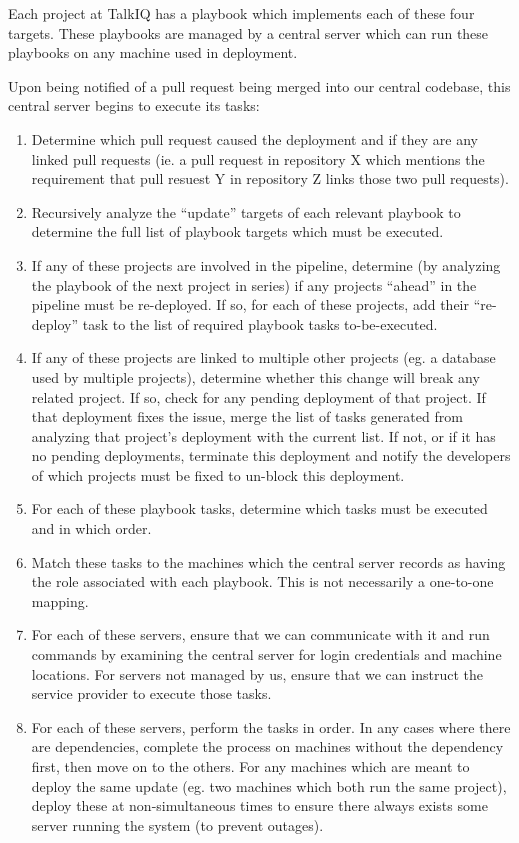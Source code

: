 \documentclass[12pt]{article}
\begin{document}
Each project at TalkIQ has a playbook which implements each of these four targets. These playbooks are managed by a central server which can run these playbooks on any machine used in deployment.

Upon being notified of a pull request being merged into our central codebase, this central server begins to execute its tasks:
\begin{enumerate}
\item Determine which pull request caused the deployment and if they are any linked pull requests (ie. a pull request in repository X which mentions the requirement that pull resuest Y in repository Z links those two pull requests).
\item Recursively analyze the ``update'' targets of each relevant playbook to determine the full list of playbook targets which must be executed.
\item If any of these projects are involved in the pipeline, determine (by analyzing the playbook of the next project in series) if any projects ``ahead'' in the pipeline must be re-deployed. If so, for each of these projects, add their ``re-deploy'' task to the list of required playbook tasks to-be-executed.
\item If any of these projects are linked to multiple other projects (eg. a database used by multiple projects), determine whether this change will break any related project. If so, check for any pending deployment of that project. If that deployment fixes the issue, merge the list of tasks generated from analyzing that project's deployment with the current list. If not, or if it has no pending deployments, terminate this deployment and notify the developers of which projects must be fixed to un-block this deployment.
\item For each of these playbook tasks, determine which tasks must be executed and in which order.
\item Match these tasks to the machines which the central server records as having the role associated with each playbook. This is not necessarily a one-to-one mapping.
\item For each of these servers, ensure that we can communicate with it and run commands by examining the central server for login credentials and machine locations. For servers not managed by us, ensure that we can instruct the service provider to execute those tasks.
\item For each of these servers, perform the tasks in order. In any cases where there are dependencies, complete the process on machines without the dependency first, then move on to the others. For any machines which are meant to deploy the same update (eg. two machines which both run the same project), deploy these at non-simultaneous times to ensure there always exists some server running the system (to prevent outages).

\end{enumerate}
\end{document}
